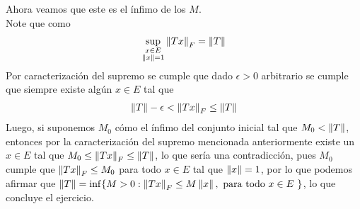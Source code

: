 \begin{homeworkProblem}
\begin{solution}
\begin{enumerate}[(i)]
      Ahora veamos que este es el ínfimo de los $M$.\\
      Note que como
      \begin{align*}
        \sup_{\substack{x\in E\\\left\|x\right\|=1}}\left\|Tx\right\|_{F}=\left\|T\right\|
      \end{align*}
      Por caracterización del supremo se cumple que dado $\epsilon>0$ arbitrario se cumple que siempre existe algún $x\in E$ tal que
      \begin{align*}
        \left\|T\right\|-\epsilon < \left\|Tx\right\|_{F} \leq \left\|T\right\|
      \end{align*}
      Luego, si suponemos $M_0$ cómo el ínfimo del conjunto inicial tal que $M_0<\left\|T\right\|$, entonces por la caracterización del supremo mencionada anteriormente existe un $x\in E$ tal que $M_0\leq \left\|Tx\right\|_{F}\leq \left\|T\right\|$, lo que sería una contradicción, pues $M_0$ cumple que $\left\|Tx\right\|_{F}\leq M_0$ para todo $x\in E$ tal que $\left\|x\right\|=1$, por lo que podemos afirmar que $\left\|T\right\|=\inf\{M>0:\left\|Tx\right\|_{F}\leq M\left\|x\right\|,\text{ para todo $x\in E$ }\}$, lo que concluye el ejercicio. 
    \end{enumerate}
  \end{solution}
\end{homeworkProblem}
